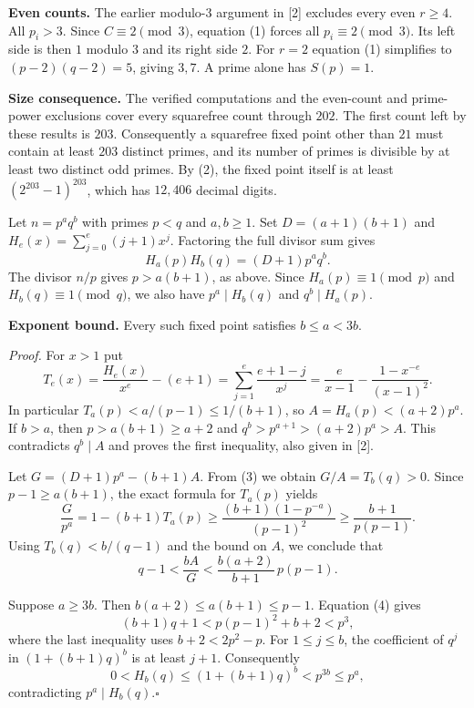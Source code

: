 \documentclass[12pt,letterpaper]{article}
\newcommand{\hd}[1]{\par\vspace{3pt}{\large\sffamily\bfseries\color{teal} #1}\par}
\newcommand{\thm}[1]{\textbf{\color{ink}#1.}\enspace}
\newcommand{\qedx}{\hfill\(\square\)}
\begin{document}
\thm{Even counts} The earlier modulo-$3$ argument in [2] excludes every even $r\ge4$. All $p_i>3$. Since $C\equiv2\pmod3$, equation (1) forces all $p_i\equiv2\pmod3$. Its left side is then $1$ modulo $3$ and its right side $2$. For $r=2$ equation (1) simplifies to $(p-2)(q-2)=5$, giving $3,7$. A prime alone has $S(p)=1$.

\thm{Size consequence} The verified computations and the even-count and prime-power exclusions cover every squarefree count through $202$. The first count left by these results is $203$. Consequently a squarefree fixed point other than $21$ must contain at least $203$ distinct primes, and its number of primes is divisible by at least two distinct odd primes. By (2), the fixed point itself is at least $(2^{203}-1)^{203}$, which has $12{,}406$ decimal digits.

\newpage
\hd{3\quad Comparing the exponents of two primes}
Let $n=p^a q^b$ with primes $p<q$ and $a,b\ge1$. Set $D=(a+1)(b+1)$ and $H_e(x)=\sum_{j=0}^e(j+1)x^j$. Factoring the full divisor sum gives
\begin{equation}
H_a(p)H_b(q)=(D+1)p^a q^b. \tag{3}
\end{equation}
The divisor $n/p$ gives $p>a(b+1)$, as above. Since $H_a(p)\equiv1\pmod p$ and $H_b(q)\equiv1\pmod q$, we also have $p^a\mid H_b(q)$ and $q^b\mid H_a(p)$.

\thm{Exponent bound} Every such fixed point satisfies $b\le a<3b$.

\emph{Proof.} For $x>1$ put
\[
T_e(x)=\frac{H_e(x)}{x^e}-(e+1)
=\sum_{j=1}^e\frac{e+1-j}{x^j}
=\frac{e}{x-1}-\frac{1-x^{-e}}{(x-1)^2}.
\]
In particular $T_a(p)<a/(p-1)\le1/(b+1)$, so $A=H_a(p)<(a+2)p^a$. If $b>a$, then $p>a(b+1)\ge a+2$ and $q^b>p^{a+1}>(a+2)p^a>A$. This contradicts $q^b\mid A$ and proves the first inequality, also given in [2].

Let $G=(D+1)p^a-(b+1)A$. From (3) we obtain $G/A=T_b(q)>0$. Since $p-1\ge a(b+1)$, the exact formula for $T_a(p)$ yields
\[
\frac{G}{p^a}=1-(b+1)T_a(p)\ge\frac{(b+1)(1-p^{-a})}{(p-1)^2}
\ge\frac{b+1}{p(p-1)}.
\]
Using $T_b(q)<b/(q-1)$ and the bound on $A$, we conclude that
\begin{equation}
q-1<\frac{bA}{G}<\frac{b(a+2)}{b+1}\,p(p-1). \tag{4}
\end{equation}

Suppose $a\ge3b$. Then $b(a+2)\le a(b+1)\le p-1$. Equation (4) gives
\[
(b+1)q+1 < p(p-1)^2+b+2 < p^3,
\]
where the last inequality uses $b+2<2p^2-p$. For $1\le j\le b$, the coefficient of $q^j$ in $(1+(b+1)q)^b$ is at least $j+1$. Consequently
\[
0<H_b(q)\le(1+(b+1)q)^b<p^{3b}\le p^a,
\]
contradicting $p^a\mid H_b(q)$.\qedx
\end{document}
